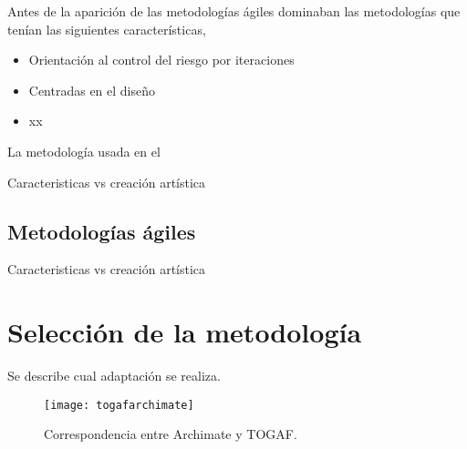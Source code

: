 Antes de la aparición de las metodologías ágiles dominaban las metodologías que tenían las siguientes características,

\begin{itemize}
  \item Orientación al control del riesgo por iteraciones
  \item Centradas en el diseño
  \item xx
\end{itemize}

La metodología usada en el

Caracteristicas vs creación artística

\subsection{Metodologías ágiles}

Caracteristicas vs creación artística

\section{Selección de la metodología}

Se describe cual adaptación se realiza.










\begin{figure}[h]\label{togafarchimate}
\centering
\texttt{[image: togafarchimate]}
\caption{Correspondencia entre Archimate y TOGAF.}
\end{figure}
